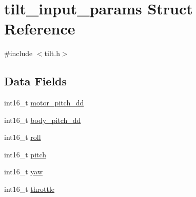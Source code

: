 \hypertarget{structtilt__input__params}{\section{tilt\+\_\+input\+\_\+params Struct Reference}
\label{structtilt__input__params}
}


{\ttfamily \#include $<$tilt.\+h$>$}

\subsection*{Data Fields}
\begin{DoxyCompactItemize}
\item 
int16\+\_\+t \hyperlink{structtilt__input__params_a11386ba868291c551805055e98d245c7}{motor\+\_\+pitch\+\_\+dd}
\item 
int16\+\_\+t \hyperlink{structtilt__input__params_aa39098c64be261c839d5e77d87b14a60}{body\+\_\+pitch\+\_\+dd}
\item 
int16\+\_\+t \hyperlink{structtilt__input__params_a745f9d362a546b08eaba4a68debafc42}{roll}
\item 
int16\+\_\+t \hyperlink{structtilt__input__params_a127abbf9c4e9ba2ec7e570622ddd57a4}{pitch}
\item 
int16\+\_\+t \hyperlink{structtilt__input__params_a98d24d8dbe2bf223ab7ed01b7b28abf8}{yaw}
\item 
int16\+\_\+t \hyperlink{structtilt__input__params_a254114b08c48543c13f873c2a73914d3}{throttle}
\end{DoxyCompactItemize}


